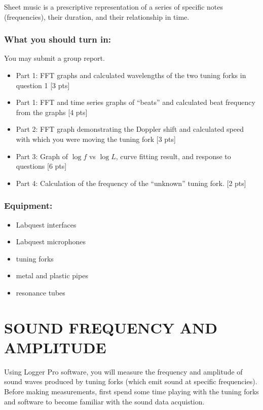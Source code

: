\documentclass[11pt,letterpaper]{article}
\newcounter{question}[section]
\begin{document}
Sheet music is a prescriptive representation of a series of specific notes (frequencies), their duration, and their relationship in time.

\subsubsection*{What you should turn in:} 
You may submit a group report.
\begin{itemize}
\setlength{\parskip}{3pt}
\item Part 1: FFT graphs and calculated wavelengths of the two tuning forks in question 1 [3 pts]
\item Part 1: FFT and time series graphs of ``beats'' and calculated beat frequency from the graphs [4 pts]
\item Part 2: FFT graph demonstrating the Doppler shift and calculated speed with which you were moving the tuning fork [3 pts]
\item Part 3: Graph of $\log f$ vs $\log L$, curve fitting result, and response to questions [6 pts]
\item Part 4: Calculation of the frequency of the ``unknown'' tuning fork. [2 pts]
\end{itemize}

\subsubsection*{Equipment:}
\begin{itemize}
\setlength{\parskip}{3pt}
\item Labquest interfaces
\item Labquest microphones
\item tuning forks
\item metal and plastic pipes
\item resonance tubes
\end{itemize}

\section{SOUND FREQUENCY AND AMPLITUDE}
Using Logger Pro software, you will measure the frequency and amplitude of sound waves produced by tuning forks (which emit sound at specific frequencies). Before making measurements, first spend some time playing with the tuning forks and software to become familiar with the sound data acquistion.
\end{document}
